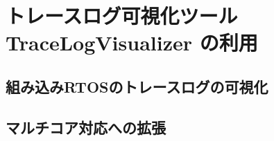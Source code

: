 \chapter{トレースログ可視化ツール TraceLogVisualizer の利用}

\section{組み込みRTOSのトレースログの可視化}

\section{マルチコア対応への拡張}
